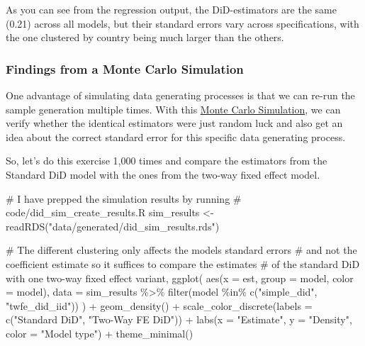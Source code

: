 \documentclass[
  letterpaper,
  DIV=11,
  numbers=noendperiod]{scrartcl}
\newenvironment{Shaded}{\begin{snugshade}}{\end{snugshade}}
\newcommand{\AttributeTok}[1]{\textcolor[rgb]{0.40,0.45,0.13}{#1}}
\newcommand{\CommentTok}[1]{\textcolor[rgb]{0.37,0.37,0.37}{#1}}
\newcommand{\FunctionTok}[1]{\textcolor[rgb]{0.28,0.35,0.67}{#1}}
\newcommand{\NormalTok}[1]{\textcolor[rgb]{0.00,0.23,0.31}{#1}}
\newcommand{\OtherTok}[1]{\textcolor[rgb]{0.00,0.23,0.31}{#1}}
\newcommand{\SpecialCharTok}[1]{\textcolor[rgb]{0.37,0.37,0.37}{#1}}
\newcommand{\StringTok}[1]{\textcolor[rgb]{0.13,0.47,0.30}{#1}}
\begin{document}
As you can see from the regression output, the DiD-estimators are the
same (0.21) across all models, but their standard errors vary across
specifications, with the one clustered by country being much larger than
the others.

\subsubsection{Findings from a Monte Carlo
Simulation}\label{findings-from-a-monte-carlo-simulation}

One advantage of simulating data generating processes is that we can
re-run the sample generation multiple times. With this
\href{https://en.wikipedia.org/wiki/Monte_Carlo_method}{Monte Carlo
Simulation}, we can verify whether the identical estimators were just
random luck and also get an idea about the correct standard error for
this specific data generating process.

So, let's do this exercise 1,000 times and compare the estimators from
the Standard DiD model with the ones from the two-way fixed effect
model.

\begin{Shaded}
\begin{Highlighting}[]
\CommentTok{\# I have prepped the simulation results by running }
\CommentTok{\# \textasciigrave{}code/did\_sim\_create\_results.R\textasciigrave{}}
\NormalTok{sim\_results }\OtherTok{\textless{}{-}} \FunctionTok{readRDS}\NormalTok{(}\StringTok{"data/generated/did\_sim\_results.rds"}\NormalTok{)}

\CommentTok{\# The different clustering only affects the model\textquotesingle{}s standard errors }
\CommentTok{\# and not the coefficient estimate so it suffices to compare the estimates}
\CommentTok{\# of the standard DiD with one two{-}way fixed effect variant,}
\FunctionTok{ggplot}\NormalTok{(}
    \FunctionTok{aes}\NormalTok{(}\AttributeTok{x =}\NormalTok{ est, }\AttributeTok{group =}\NormalTok{ model, }\AttributeTok{color =}\NormalTok{ model), }
    \AttributeTok{data =}\NormalTok{ sim\_results }\SpecialCharTok{\%\textgreater{}\%} \FunctionTok{filter}\NormalTok{(model }\SpecialCharTok{\%in\%} \FunctionTok{c}\NormalTok{(}\StringTok{"simple\_did"}\NormalTok{, }\StringTok{"twfe\_did\_iid"}\NormalTok{))}
\NormalTok{) }\SpecialCharTok{+}
    \FunctionTok{geom\_density}\NormalTok{() }\SpecialCharTok{+}
    \FunctionTok{scale\_color\_discrete}\NormalTok{(}\AttributeTok{labels =} \FunctionTok{c}\NormalTok{(}\StringTok{"Standard DiD"}\NormalTok{, }\StringTok{"Two{-}Way FE DiD"}\NormalTok{)) }\SpecialCharTok{+}
    \FunctionTok{labs}\NormalTok{(}\AttributeTok{x =} \StringTok{"Estimate"}\NormalTok{, }\AttributeTok{y =} \StringTok{"Density"}\NormalTok{, }\AttributeTok{color =} \StringTok{"Model type"}\NormalTok{) }\SpecialCharTok{+}
    \FunctionTok{theme\_minimal}\NormalTok{()}
\end{Highlighting}
\end{Shaded}
\end{document}
